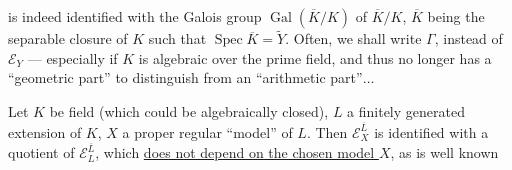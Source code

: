 
is indeed identified with the Galois group $\operatorname{Gal}(\overline K/K)$ of  $\overline K/K$, $\overline K$ being the separable closure of $K$ such that $\operatorname{Spec}\overline K=\widetilde Y$. Often, we shall write $\Gamma$,  instead of $\mathcal E_Y$ --- especially if $K$ is algebraic over the prime field, and thus no longer has a ``geometric part'' to distinguish from an ``arithmetic part''$\ldots$

Let $K$ be   field (which could be algebraically closed), $L$ a finitely generated extension of $K$, $X$ a proper regular ``model'' of $L$. Then $\mathcal E_X^{\overline L}$ is identified with a quotient of $\mathcal E_L^{\overline L}$, which \uline{does  not depend on the chosen model $X$}, as is well known

